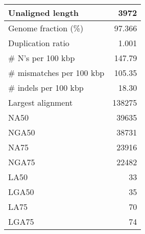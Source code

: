 \documentclass[12pt,a4paper]{article}
\begin{document}
\begin{table}[ht]
\begin{center}
\begin{tabular}{|l*{1}{|r}|}
Unaligned length & 3972 \\ \hline
Genome fraction (\%) & 97.366 \\ \hline
Duplication ratio & 1.001 \\ \hline
\# N's per 100 kbp & 147.79 \\ \hline
\# mismatches per 100 kbp & 105.35 \\ \hline
\# indels per 100 kbp & 18.30 \\ \hline
Largest alignment & 138275 \\ \hline
NA50 & 39635 \\ \hline
NGA50 & 38731 \\ \hline
NA75 & 23916 \\ \hline
NGA75 & 22482 \\ \hline
LA50 & 33 \\ \hline
LGA50 & 35 \\ \hline
LA75 & 70 \\ \hline
LGA75 & 74 \\ \hline
\end{tabular}
\end{center}
\end{table}
\end{document}
